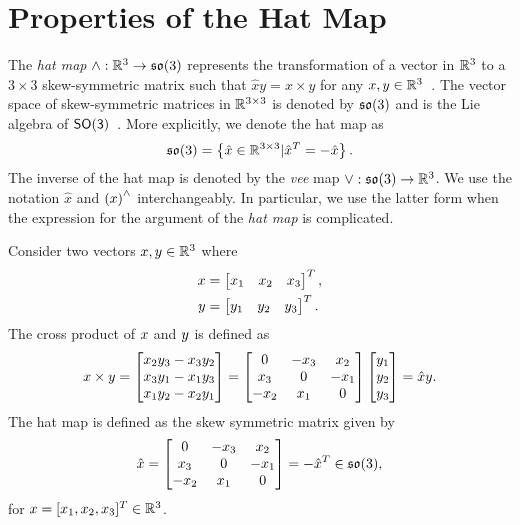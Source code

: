 
\chapter{Properties of the Hat Map}\label{chap:hat_map}

The \textit{hat map} $\wedge :\mathbb{R}^{3}\rightarrow\mathfrak{so}(3)$ represents the transformation of a vector in $\mathbb{R}^{3}$ to a $3\times 3$ skew-symmetric matrix such that $\hat x y = x\times y$ for any $x,y\in\mathbb{R}^{3}$~\cite{bullo2004}. 
The vector space of skew-symmetric matrices in \( \mathbb{R}^{3 \times 3 } \) is denoted by \( \mathfrak{so}(3) \) and is the Lie algebra of \( \mathsf{SO(3)} \)~\cite{hall2015}.
More explicitly, we denote the hat map as
\begin{align*}
    \mathfrak{so}(3) = \left\{  \hat x \in \mathbb{R}^{3 \times 3} | \hat x^T = - \hat x  \right\}.
\end{align*}
The inverse of the hat map is denoted by the \textit{vee} map $\vee:\mathfrak{so}(3)\rightarrow\mathbb{R}^{3}$. 
We use the notation \( \hat{x}\) and \( \left( x \right)^\wedge\) interchangeably.
In particular, we use the latter form when the expression for the argument of the \textit{hat map} is complicated. 

Consider two vectors \( x, y \in \mathbb{R}^3\) where
\begin{align*}
    x &= \begin{bmatrix} x_1 & x_2 & x_3 \end{bmatrix}^T , \\
    y &= \begin{bmatrix} y_1 & y_2 & y_3 \end{bmatrix}^T .
\end{align*}
The cross product of \( x \) and \( y \) is defined as
\begin{align}
    x \times y = 
    \begin{bmatrix} 
        x_2 y_3 - x_3 y_2 \\
        x_3 y_1 - x_1 y_3 \\
        x_1 y_2 - x_2 y_1 
    \end{bmatrix}
    = 
    \begin{bmatrix} 0 & -x_3 & x_2 \\ x_3 & 0 & -x_1 \\ -x_2 & x_1 & 0\end{bmatrix}
    \begin{bmatrix} y_1 \\ y_2 \\ y_3 \end{bmatrix}
    = \hat{x} y.
\end{align}
The hat map is defined as the skew symmetric matrix given by
\begin{align}
    \hat x = \begin{bmatrix} 0 & -x_3 & x_2 \\ x_3 & 0 & -x_1 \\ -x_2 & x_1 & 0\end{bmatrix} 
    = - \hat{x}^T \in \mathfrak{so}(3) ,
\end{align}
for $x=[x_1,x_2,x_3]^T\in\mathbb{R}^{3}$. 

